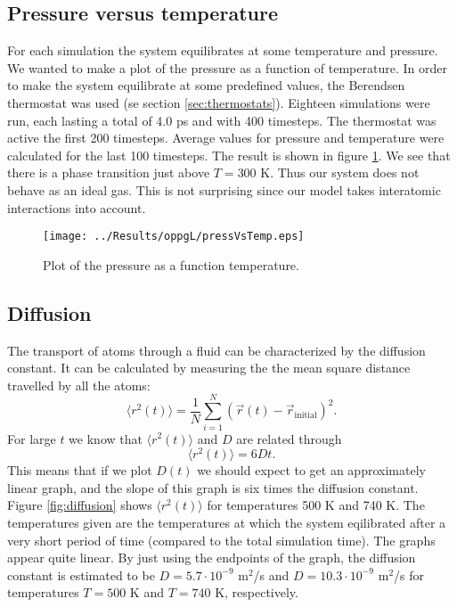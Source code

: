 \documentclass[12pt]{article}
\newcommand{\bdi}{\begin{displaymath}}
\newcommand{\edi}{\end{displaymath}}
\begin{document}
\subsection{Pressure versus temperature}

For each simulation the system equilibrates at some temperature and pressure. We wanted to make a plot of the pressure as a function of temperature. In order to make the system
equilibrate at some predefined values, the Berendsen thermostat was used (se section \ref{sec:thermostats}). Eighteen simulations were run, each lasting a total of 4.0 ps and with
400 timesteps. The thermostat was active the first 200 timesteps. Average values for pressure and temperature were calculated for the last 100 timesteps. The result is shown in figure \ref{fig:pressVsTemp}.
We see that there is a phase transition just above $T=300$ K. Thus our system does not behave as an ideal gas. This is not surprising since our model takes interatomic interactions into account. 

\begin{figure}[!ht]
 \begin{center}
 \label{fig:pressVsTemp}
  \texttt{[image: ../Results/oppgL/pressVsTemp.eps]}
  \caption{Plot of the pressure as a function temperature.}
 \end{center}
\end{figure}




\subsection{Diffusion}

The transport of atoms through a fluid can be characterized by the diffusion constant. It can be calculated by measuring the the mean square distance travelled by all the atoms:
\bdi
\langle r^2(t)\rangle = \frac{1}{N}\sum_{i=1}^N(\vec r(t) - \vec r_{\mathrm{initial}})^2.
\edi
For large $t$ we know that $\langle r^2(t)\rangle$ and $D$ are related through
\bdi
\langle r^2(t)\rangle = 6Dt.
\edi
This means that if we plot $D(t)$ we should expect to get an approximately linear graph, and the slope of this graph is six times the diffusion constant. Figure \ref{fig:diffusion}
shows $\langle r^2(t)\rangle$ for temperatures 500 K and 740 K. The temperatures given are the temperatures at which the system eqilibrated after a very short period of time (compared
to the total simulation time). The graphs appear quite linear. By just using the endpoints of the graph, the diffusion constant is estimated to be $D=5.7\cdot10^{-9}$ m$^2$/s
and $D=10.3\cdot10^{-9}$ m$^2$/s for temperatures $T=500$ K and
$T = 740$ K, respectively.
\end{document}
